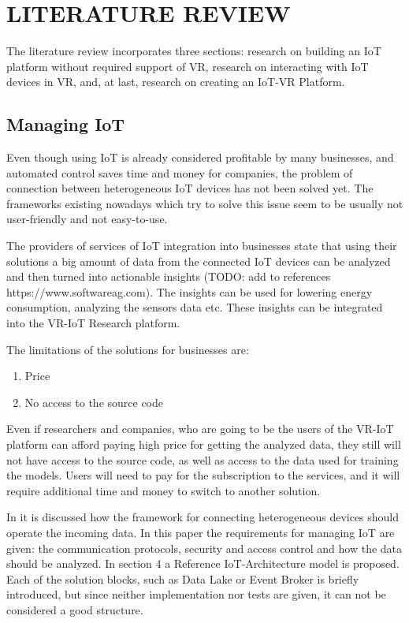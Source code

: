 
\chapter{LITERATURE REVIEW}


The literature review incorporates three sections: research on building an IoT platform without required support of VR, research on interacting with IoT devices in VR, and, at last, research on creating an IoT-VR Platform.

\section{Managing IoT}

Even though using IoT is already considered profitable by many businesses, and automated control saves 
time and money for companies, the problem of connection between heterogeneous IoT devices has not been solved yet. The frameworks existing nowadays which try to solve this issue seem to be usually not user-friendly and not easy-to-use. 

The providers of services of IoT integration into businesses state that using their solutions a big 
amount of data from the connected IoT devices can be analyzed and then turned into actionable 
insights (TODO: add to references https://www.softwareag.com). The insights can be used for lowering energy consumption, analyzing the sensors data etc. These insights can be integrated into the VR-IoT Research platform.

The limitations of the solutions for businesses are:
\begin{enumerate}
    \item Price
    \item No access to the source code
\end{enumerate}

Even if researchers and companies, who are going to be the users of the VR-IoT platform can afford paying high price for getting the analyzed data, they still will not have access to the source code, as well as access to the data used for training the models. Users will need to pay for the subscription to the services, and it will require additional time and money to switch to another solution.

In \cite{k_mohapatra_solution_2016} it is discussed how the framework for connecting heterogeneous devices should operate the incoming data. In this paper the requirements for managing IoT are given: the communication protocols, security and access control and how the data should be analyzed. In section 4 a Reference IoT-Architecture model is proposed. Each of the solution blocks, such as Data Lake or Event Broker is briefly introduced, but since neither implementation nor tests are given, it can not be considered a good structure.

